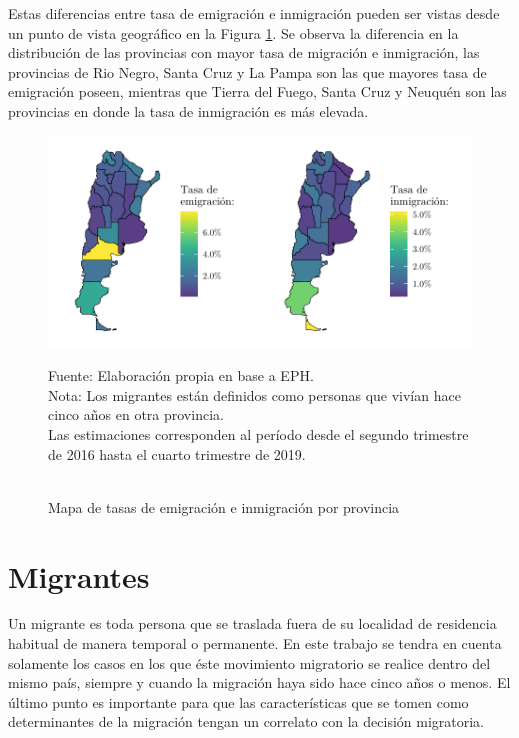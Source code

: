 \documentclass[12pt,a4paper]{article}
\begin{document}
Estas diferencias entre tasa de emigración e inmigración pueden ser vistas desde un punto de vista geográfico en la Figura \ref{figure:emig_inmig_prov_mapa}. Se observa la diferencia en la distribución de las provincias con mayor tasa de migración e inmigración, las provincias de Rio Negro, Santa Cruz y La Pampa son las que mayores tasa de emigración poseen, mientras que Tierra del Fuego, Santa Cruz y Neuquén son  las provincias en donde la tasa de inmigración es más elevada.
\begin{figure}[h!]
\begin{center}
\caption{\\Mapa de tasas de emigración e inmigración por provincia}
\includegraphics[scale=1.1]{./graficos/emig_inmig_por_prov.pdf}
\label{figure:emig_inmig_prov_mapa}
\end{center}
\begin{flushleft}
\begin{scriptsize}
Fuente: Elaboración propia en base a EPH.\\
Nota: Los migrantes están definidos como personas que vivían hace cinco años en otra provincia.\\
Las estimaciones corresponden al período desde el segundo trimestre de 2016 hasta el cuarto trimestre de 2019.
\end{scriptsize}
\end{flushleft}
\end{figure}
\newpage
\section{Migrantes}
Un migrante es toda persona que se traslada fuera de su localidad de residencia habitual de manera temporal o permanente. En este trabajo se tendra en cuenta solamente los casos en los que éste movimiento migratorio se realice dentro del mismo país, siempre y cuando la migración haya sido hace cinco años o menos. El último punto es importante para que las características que se tomen como determinantes de la migración tengan un correlato con la decisión migratoria.
\end{document}
